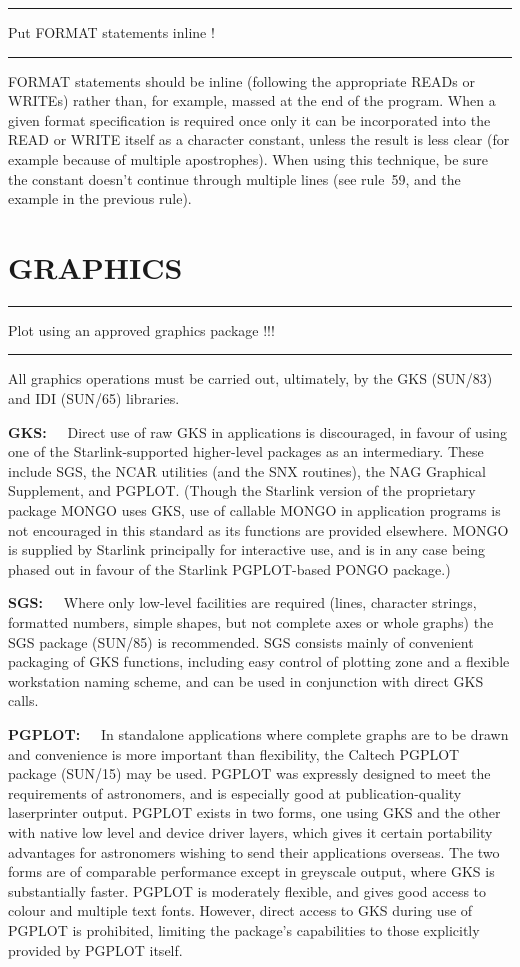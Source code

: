 \documentclass[twoside,11pt]{article}
\newcounter{sruleno}
\newcommand{\srule}[1]{
    \addtocounter{sruleno}{1}
    \goodbreak
    \rule[0.5ex]{\textwidth}{0.3mm}
    {\Large #1 \hfill {\thesruleno}}
    \rule[0.5ex]{\textwidth}{0.1mm}
}
\newcommand{\srule}[1]{
       \addtocounter{sruleno}{1}
       \begin{rawhtml} <HR> \end{rawhtml}
       {\Large \thesruleno}~~~~{\Large #1}
       \begin{rawhtml} <HR> \end{rawhtml}
       \end{tabular}
  }
\renewcommand{\_}{{\tt\char'137}}
\begin{document}
\srule{Put FORMAT statements inline !}
FORMAT statements should be inline (following the appropriate READs or WRITEs)
rather than, for example, massed at the end of the program.
When a given format
specification is required once only it can be incorporated into the READ
or WRITE itself as a character
constant, unless the result is less clear (for example because of
multiple apostrophes).  When using this technique, be sure
the constant doesn't continue through multiple lines (see rule~59,
and the example in the previous rule).

\newpage
\section{GRAPHICS}

\srule{Plot using an approved graphics package !!!}
All graphics operations must be carried out, ultimately,
by the GKS (SUN/83) and IDI (SUN/65) libraries.

{\bf GKS:~~} Direct use of raw GKS in applications is
discouraged, in favour of using one
of the Starlink-supported higher-level packages as an intermediary.
These include SGS, the \mbox{NCAR} utilities (and the SNX routines),
the NAG Graphical Supplement, and \mbox{PGPLOT}.  (Though the Starlink
version of the proprietary package MONGO uses GKS, use of
callable MONGO in application
programs is not encouraged in this standard as its functions
are provided elsewhere.  MONGO is supplied by Starlink principally
for interactive use, and is in any case being phased out in favour
of the Starlink \mbox{PGPLOT}-based PONGO package.)

{\bf SGS:~~} Where only low-level facilities are required (lines,
character strings, formatted numbers, simple shapes, but
not complete axes or whole graphs) the SGS package (SUN/85)
is recommended.  SGS consists mainly of convenient packaging
of GKS functions, including easy control of plotting zone
and a flexible workstation naming scheme, and can be used
in conjunction with direct GKS calls.

{\bf PGPLOT:~~} In standalone applications where complete graphs are to be
drawn and convenience is more important than flexibility,
the Caltech \mbox{PGPLOT} package (SUN/15) may be used.
\mbox{PGPLOT} was expressly designed to meet the requirements of
astronomers, and is especially
good at publication-quality laserprinter output.
\mbox{PGPLOT} exists in two forms, one using GKS and the other
with native low level and device driver layers, which gives
it certain portability advantages for astronomers
wishing to send their applications overseas.
The two forms are of comparable performance except in greyscale output,
where GKS is substantially faster.
\mbox{PGPLOT} is moderately flexible,
and gives good access to colour and multiple text fonts.
However, direct access to GKS during use of \mbox{PGPLOT}
is prohibited, limiting the package's capabilities
to those explicitly provided by \mbox{PGPLOT} itself.
\end{document}
